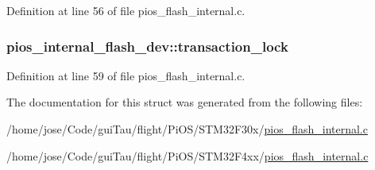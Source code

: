 Definition at line 56 of file pios\-\_\-flash\-\_\-internal.\-c.

\hypertarget{structpios__internal__flash__dev_aff0936adda4381f50332373503f0f34e}{
\subsubsection[{transaction\-\_\-lock}]{ pios\-\_\-internal\-\_\-flash\-\_\-dev\-::transaction\-\_\-lock}}\label{structpios__internal__flash__dev_aff0936adda4381f50332373503f0f34e}


Definition at line 59 of file pios\-\_\-flash\-\_\-internal.\-c.



The documentation for this struct was generated from the following files\-:\begin{DoxyCompactItemize}
\item 
/home/jose/\-Code/gui\-Tau/flight/\-Pi\-O\-S/\-S\-T\-M32\-F30x/\hyperlink{_s_t_m32_f30x_2pios__flash__internal_8c}{pios\-\_\-flash\-\_\-internal.\-c}\item 
/home/jose/\-Code/gui\-Tau/flight/\-Pi\-O\-S/\-S\-T\-M32\-F4xx/\hyperlink{_s_t_m32_f4xx_2pios__flash__internal_8c}{pios\-\_\-flash\-\_\-internal.\-c}\end{DoxyCompactItemize}
